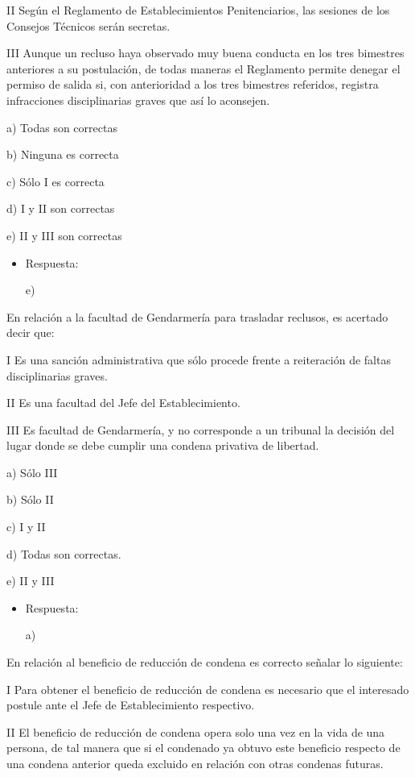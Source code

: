 \documentclass[letterpaper, 11pt]{article}
\begin{document}
II Según el Reglamento de Establecimientos Penitenciarios, las
sesiones de los Consejos Técnicos serán secretas.

III Aunque un recluso haya observado muy buena conducta en los tres
bimestres anteriores a su postulación, de todas maneras el Reglamento
permite denegar el permiso de salida si, con anterioridad a los tres
bimestres referidos, registra infracciones disciplinarias graves que
así lo aconsejen.

a) Todas son correctas

b) Ninguna es correcta

c) Sólo I es correcta

d) I y II son correctas

e) II y III son correctas

\begin{itemize}
\item Respuesta:

e)
\end{itemize}


En relación a la facultad de Gendarmería para trasladar reclusos, es
acertado decir que:


I Es una sanción administrativa que sólo procede frente a reiteración
de faltas disciplinarias graves.

II Es una facultad del Jefe del Establecimiento.

III Es facultad de Gendarmería, y no corresponde a un tribunal la
decisión del lugar donde se debe cumplir una condena privativa de
libertad.

a) Sólo III

b) Sólo II

c) I y II

d) Todas son correctas.


e) II y III

\begin{itemize}
\item Respuesta:

a)
\end{itemize}


En relación al beneficio de reducción de condena es correcto señalar
lo siguiente:


I Para obtener el beneficio de reducción de condena es necesario que
el interesado postule ante el Jefe de Establecimiento respectivo.

II El beneficio de reducción de condena opera solo una vez en la vida
de una persona, de tal manera que si el condenado ya obtuvo este
beneficio respecto de una condena anterior queda excluido en relación
con otras condenas futuras.
\end{document}
